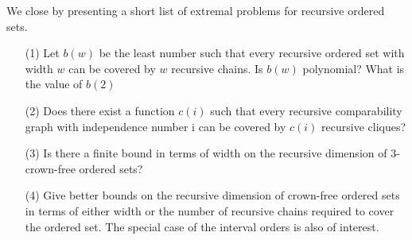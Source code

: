 \documentclass[twoside]{article}
\begin{document}
We close by presenting a short list of extremal problems for recursive ordered sets.\\

\begin{itemize}
  \item[(1)] Let $b(w)$ be the least number such that every recursive ordered set with width $w$ can be
  covered by $w$ recursive chains. Is $b(w)$ polynomial? What is the value of $b(2)$\\
  \item[(2)] Does there exist a function $c(i)$ such that every recursive comparability graph with 
  independence number i can be covered by $c(i)$ recursive cliques?\\
  \item[(3)] Is there a finite bound in terms of width on the recursive dimension of 3-crown-free ordered sets?\\
  \item[(4)] Give better bounds on the recursive dimension of crown-free ordered sets in terms of either width 
  or the number of recursive chains required to cover the ordered set. The special case of the interval orders is also of interest.
\end{itemize}




\renewcommand\refname{Bibliography}


\end{document}

